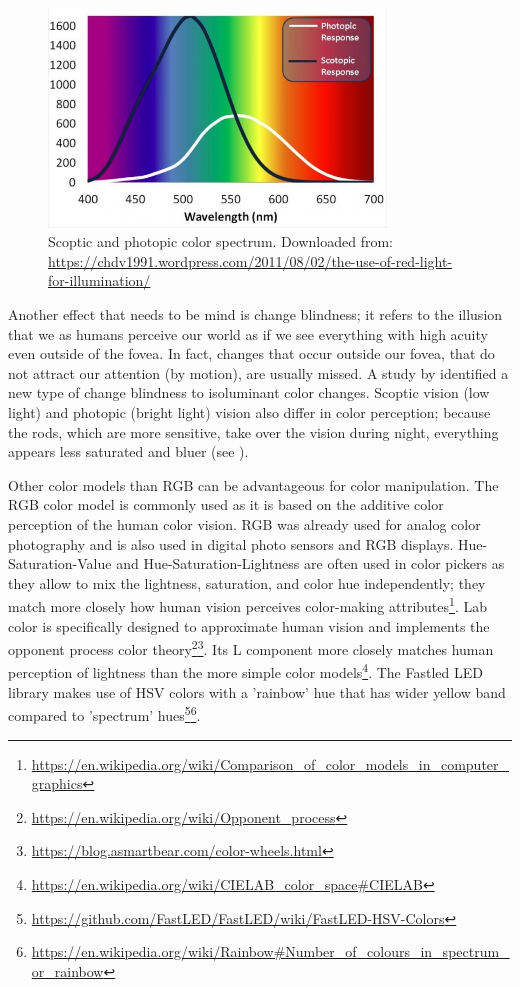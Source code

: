 \begin{figure}
    \includegraphics[width=0.8\textwidth]{fig/scoptic.jpg}
    \caption[Color spectrum]{Scoptic and photopic color spectrum. Downloaded from: \url{https://chdv1991.wordpress.com/2011/08/02/the-use-of-red-light-for-illumination/}}
    \label{fig:spectrum}
\end{figure}
Another effect that needs to be mind is change blindness; it refers to the illusion that we as humans perceive our world as if we see everything with high acuity even outside of the fovea. In fact, changes that occur outside our fovea, that do not attract our attention (by motion), are usually missed. A study by \citet{Goddard2013AScale} identified a new type of change blindness to isoluminant color changes. Scoptic vision (low light) and photopic (bright light) vision also differ in color perception; because the rods, which are more sensitive, take over the vision during night, everything appears less saturated and bluer (see \emph{}).

Other color models than RGB can be advantageous for color manipulation. The RGB color model is commonly used as it is based on the additive color perception of the human color vision. RGB was already used for analog color photography and is also used in digital photo sensors and RGB displays. Hue-Saturation-Value and Hue-Saturation-Lightness are often used in color pickers as they allow to mix the lightness, saturation, and color hue independently; they match more closely how human vision perceives color-making attributes\footnote{\url{https://en.wikipedia.org/wiki/Comparison_of_color_models_in_computer_graphics}}. Lab color is specifically designed to approximate human vision and implements the  opponent process color theory\footnote{\url{https://en.wikipedia.org/wiki/Opponent_process}}\fnsep\footnote{\url{https://blog.asmartbear.com/color-wheels.html}}. Its L component more closely matches human perception of lightness than the more simple color models\footnote{\url{https://en.wikipedia.org/wiki/CIELAB_color_space\#CIELAB}}. The Fastled LED library makes use of HSV colors with a 'rainbow' hue that has wider yellow band compared to 'spectrum' hues\footnote{\url{https://github.com/FastLED/FastLED/wiki/FastLED-HSV-Colors}}\fnsep\footnote{\url{https://en.wikipedia.org/wiki/Rainbow\#Number_of_colours_in_spectrum_or_rainbow}}.  

